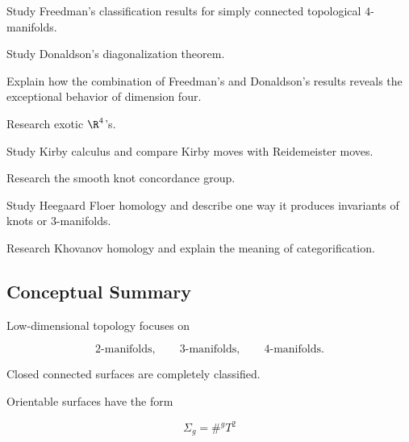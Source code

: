 \begin{exercise}[4]
Study Freedman's classification results for simply connected topological
\(4\)-manifolds.
\end{exercise}

\begin{exercise}[4]
Study Donaldson's diagonalization theorem.
\end{exercise}

\begin{exercise}[4]
Explain how the combination of Freedman's and Donaldson's results reveals
the exceptional behavior of dimension four.
\end{exercise}

\begin{exercise}[4]
Research exotic \(\R^4\)'s.
\end{exercise}

\begin{exercise}[4]
Study Kirby calculus and compare Kirby moves with Reidemeister moves.
\end{exercise}

\begin{exercise}[4]
Research the smooth knot concordance group.
\end{exercise}

\begin{exercise}[4]
Study Heegaard Floer homology and describe one way it produces invariants of
knots or \(3\)-manifolds.
\end{exercise}

\begin{exercise}[4]
Research Khovanov homology and explain the meaning of categorification.
\end{exercise}

\subsection{Conceptual Summary}
\label{subsec:low-dimensional-summary}

Low-dimensional topology focuses on

\[
\boxed{
2\text{-manifolds},
\qquad
3\text{-manifolds},
\qquad
4\text{-manifolds}.
}
\]

Closed connected surfaces are completely classified.

Orientable surfaces have the form

\[
\boxed{
\Sigma_g=\#^gT^2
}
\]

